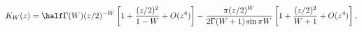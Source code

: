 \begin{equation}
\label{Eq_0404}
K_W(z) = \half \Gamma(W)(z/2)^{-W}
  \left[
  1 + \frac{(z/2)^2}{1-W} + O(z^4)
  \right]
  - \frac{\pi(z/2)^W}{2\Gamma(W+1) \sin \pi W}
  \left[
  1 + \frac{(z/2)^2}{W+1} + O(z^4)
  \right],
\end{equation}

